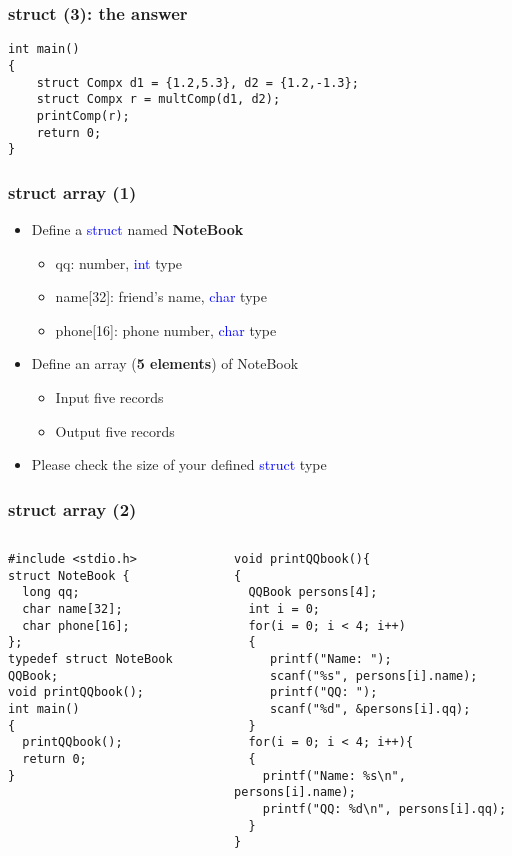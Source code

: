 \ifx\answers\undefined
\begin{frame}[fragile]
\frametitle{struct (3): the answer}
\begin{lstlisting}[firstnumber = 22, xleftmargin=0.05\linewidth, linewidth=0.96\linewidth]
int main()
{
	struct Compx d1 = {1.2,5.3}, d2 = {1.2,-1.3};
	struct Compx r = multComp(d1, d2);
	printComp(r);
	return 0;
}

\end{lstlisting}
\end{frame}
\fi


\begin{frame}
\frametitle{struct array (1)}
\begin{itemize}
	\item {Define a \textcolor{blue}{struct} named \textbf{NoteBook}}
	\begin{itemize}
		\item {qq: number, \textcolor{blue}{int} type}
		\item {name[32]: friend's name, \textcolor{blue}{char} type}
		\item {phone[16]: phone number, \textcolor{blue}{char} type}
	\end{itemize}
	\item {Define an array (\textbf{5 elements}) of NoteBook}
	\begin{itemize}
		\item {Input five records}
		\item {Output five records}
	\end{itemize}
	\item {Please check the size of your defined \textcolor{blue}{struct} type}
\end{itemize}

\end{frame}

\ifx\answers\undefined
\begin{frame}[fragile]
\frametitle{struct array (2)}
\vspace{-0.15in}
\begin{columns}
\begin{column}{0.38\linewidth}
\begin{lstlisting}[xleftmargin=0.04\linewidth]
#include <stdio.h>
struct NoteBook {
  long qq;
  char name[32];
  char phone[16];
};
typedef struct NoteBook QQBook;
void printQQbook();
int main()
{
  printQQbook();
  return 0;
}
\end{lstlisting}
\end{column}
\begin{column}{0.62\linewidth}
	\begin{lstlisting}
void printQQbook(){
{
  QQBook persons[4];
  int i = 0;
  for(i = 0; i < 4; i++)
  {
     printf("Name: ");
     scanf("%s", persons[i].name);
     printf("QQ: ");
     scanf("%d", &persons[i].qq);
  }
  for(i = 0; i < 4; i++){
  {
    printf("Name: %s\n", persons[i].name);
    printf("QQ: %d\n", persons[i].qq);
  }
}
\end{lstlisting}
\end{column}
\end{columns}
\end{frame}
\fi


